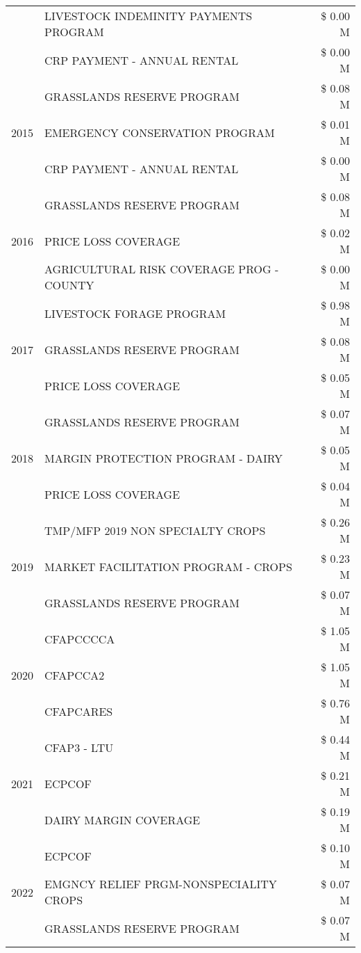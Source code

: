 \begin{tabular}{llr}
 & LIVESTOCK INDEMINITY PAYMENTS PROGRAM & \$ 0.00 M \\
 & CRP PAYMENT - ANNUAL RENTAL & \$ 0.00 M \\
\cline{1-3}
\multirow[t]{3}{*}{2015} & GRASSLANDS RESERVE PROGRAM & \$ 0.08 M \\
 & EMERGENCY CONSERVATION PROGRAM & \$ 0.01 M \\
 & CRP PAYMENT - ANNUAL RENTAL & \$ 0.00 M \\
\cline{1-3}
\multirow[t]{3}{*}{2016} & GRASSLANDS RESERVE PROGRAM & \$ 0.08 M \\
 & PRICE LOSS COVERAGE & \$ 0.02 M \\
 & AGRICULTURAL RISK COVERAGE PROG - COUNTY & \$ 0.00 M \\
\cline{1-3}
\multirow[t]{3}{*}{2017} & LIVESTOCK FORAGE PROGRAM & \$ 0.98 M \\
 & GRASSLANDS RESERVE PROGRAM & \$ 0.08 M \\
 & PRICE LOSS COVERAGE & \$ 0.05 M \\
\cline{1-3}
\multirow[t]{3}{*}{2018} & GRASSLANDS RESERVE PROGRAM & \$ 0.07 M \\
 & MARGIN PROTECTION PROGRAM - DAIRY & \$ 0.05 M \\
 & PRICE LOSS COVERAGE & \$ 0.04 M \\
\cline{1-3}
\multirow[t]{3}{*}{2019} & TMP/MFP 2019 NON SPECIALTY CROPS & \$ 0.26 M \\
 & MARKET FACILITATION PROGRAM - CROPS & \$ 0.23 M \\
 & GRASSLANDS RESERVE PROGRAM & \$ 0.07 M \\
\cline{1-3}
\multirow[t]{3}{*}{2020} & CFAPCCCCA & \$ 1.05 M \\
 & CFAPCCA2 & \$ 1.05 M \\
 & CFAPCARES & \$ 0.76 M \\
\cline{1-3}
\multirow[t]{3}{*}{2021} & CFAP3 - LTU & \$ 0.44 M \\
 & ECPCOF & \$ 0.21 M \\
 & DAIRY MARGIN COVERAGE & \$ 0.19 M \\
\cline{1-3}
\multirow[t]{3}{*}{2022} & ECPCOF & \$ 0.10 M \\
 & EMGNCY RELIEF PRGM-NONSPECIALITY CROPS & \$ 0.07 M \\
 & GRASSLANDS RESERVE PROGRAM & \$ 0.07 M \\
\cline{1-3}
\bottomrule
\end{tabular}
